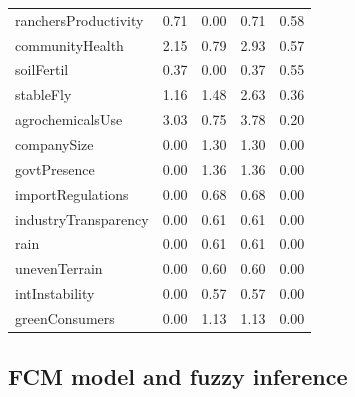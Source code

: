 \begin{table}[H]
{\begin{threeparttable}
\begin{tabular}{lcccc}
ranchersProductivity       &      0.71 &       0.00 &        0.71 &    0.58 \\
communityHealth            &      2.15 &       0.79 &        2.93 &    0.57 \\
soilFertil                 &      0.37 &       0.00 &        0.37 &    0.55 \\
stableFly                  &      1.16 &       1.48 &        2.63 &    0.36 \\
agrochemicalsUse           &      3.03 &       0.75 &        3.78 &    0.20 \\
companySize                &      0.00 &       1.30 &        1.30 &    0.00 \\
govtPresence               &      0.00 &       1.36 &        1.36 &    0.00 \\
importRegulations          &      0.00 &       0.68 &        0.68 &    0.00 \\
industryTransparency       &      0.00 &       0.61 &        0.61 &    0.00 \\
rain                       &      0.00 &       0.61 &        0.61 &    0.00 \\
unevenTerrain              &      0.00 &       0.60 &        0.60 &    0.00 \\
intInstability             &      0.00 &       0.57 &        0.57 &    0.00 \\
greenConsumers             &      0.00 &       1.13 &        1.13 &    0.00 \\
 \hline \hline
\end{tabular}
\end{threeparttable}%
}
\end{table}

\subsection{FCM model and fuzzy inference}

